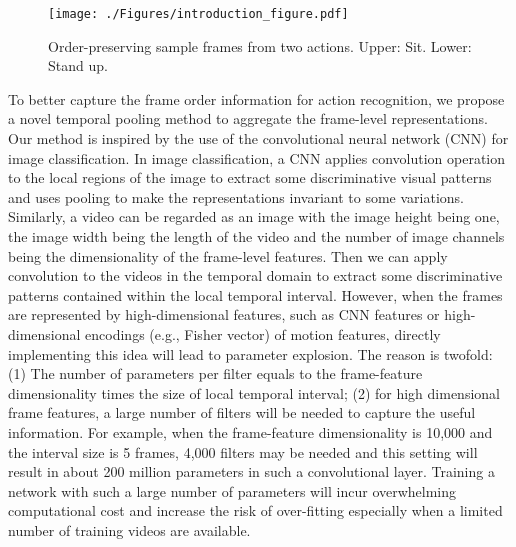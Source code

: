 \documentclass[journal]{IEEEtran}
\begin{document}
\begin{figure*}[t]
\begin{center}
\captionsetup{justification=centering}
\texttt{[image: ./Figures/introduction\_figure.pdf]}
\end{center}
   \caption{Order-preserving sample frames from two actions. Upper: Sit. Lower: Stand up.}
\label{fig:intro}
\end{figure*}

To better capture the frame order information for action recognition, we propose a novel temporal pooling method to aggregate the frame-level representations. Our method is inspired by the use of the convolutional neural network (CNN) for image classification. In image classification, a CNN applies convolution operation to the local regions of the image to extract some discriminative visual patterns and uses pooling to make the representations invariant to some variations. Similarly,
a video can be regarded as an image with the image height being one, the image width being the length of the video and the number of image channels being the dimensionality of the frame-level features. Then we can apply convolution to the videos in the temporal domain to extract some discriminative patterns contained within the local temporal interval. However, when the frames are represented by high-dimensional features, such as CNN features or high-dimensional encodings (e.g., Fisher vector) of motion features, directly implementing this idea will lead to parameter explosion. The reason is twofold: (1) The number of parameters per filter equals to the frame-feature dimensionality times the size of local temporal interval; (2) for high dimensional frame features, a large number of filters will be needed to capture the useful information.
For example, when the frame-feature dimensionality is 10,000 and the interval size is 5 frames, 4,000 filters may be needed and this setting will result in about 200 million parameters in such a convolutional layer.
Training a network with such a large number of parameters will incur overwhelming computational cost and increase the risk of over-fitting especially when a limited number of training videos are available.
\end{document}
